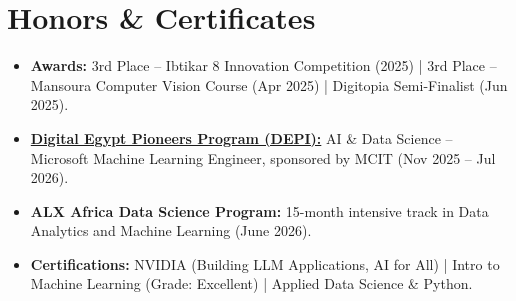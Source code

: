 \documentclass[a4paper,10pt]{article}
\begin{document}
\section{Honors \& Certificates}
\begin{itemize}[noitemsep, topsep=0pt, leftmargin=*]
    \item \textbf{Awards:} 3rd Place -- Ibtikar 8 Innovation Competition (2025) | 3rd Place -- Mansoura Computer Vision Course (Apr 2025) | Digitopia Semi-Finalist (Jun 2025).
    \item \textbf{\href{https://demro7.github.io/depi-microsoft-machine-learning-engineer-certificate.pdf}{Digital Egypt Pioneers Program (DEPI):}} AI \& Data Science -- Microsoft Machine Learning Engineer, sponsored by MCIT (Nov 2025 -- Jul 2026).
    \item \textbf{ALX Africa Data Science Program:} 15-month intensive track in Data Analytics and Machine Learning (June 2026).
    \item \textbf{Certifications:} NVIDIA (Building LLM Applications, AI for All) | Intro to Machine Learning (Grade: Excellent) | Applied Data Science \& Python.
\end{itemize}
\end{document}
